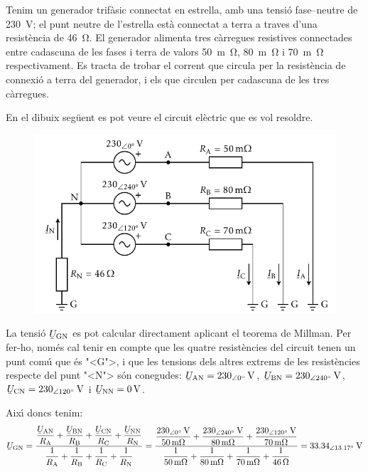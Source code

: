 \begin{exemple}

Tenim un generador trif\`{a}sic connectat en estrella, amb una tensi\'{o} fase--neutre de \SI{230}{V}; el punt neutre de l'estrella est\`{a} connectat a terra a traves d'una resist\`{e}ncia de \SI{46}{\ohm}. El generador alimenta tres c\`{a}rregues resistives connectades entre cadascuna de les fases i terra de valors \SI{50}{m\ohm}, \SI{80}{m\ohm} i \SI{70}{m\ohm} respectivament. Es tracta de trobar el corrent que circula per la resist\`{e}ncia de connexi\'{o} a terra del generador, i els que circulen per cadascuna de les tres c\`{a}rregues.

En el dibuix seg\"{u}ent es pot veure el circuit el\`{e}ctric que es vol resoldre.

\begin{figure}[htb]
    \centering
    \includegraphics{Imatges/Cap-Fonaments-Millman-Exemple2.pdf}
\end{figure}

La tensi\'{o} $\cmplx{U}\ped{GN}$ es pot calcular directament aplicant el teorema de Millman. Per fer-ho, nom\'{e}s cal tenir en compte que les quatre resist\`{e}ncies del circuit tenen un punt com\'{u} que \'{e}s {"<}G{">}, i que les tensions dels altres extrems de les resist\`{e}ncies respecte del punt {"<}N{">} s\'{o}n conegudes: $\cmplx{U}\ped{AN}=\SIpd{230}{0}{V}$, $\cmplx{U}\ped{BN}=\SIpd{230}{240}{V}$, $\cmplx{U}\ped{CN}=\SIpd{230}{120}{V}$ i  $\cmplx{U}\ped{NN}=\SI{0}{V}$.

Aix\'{\i} doncs tenim:
\[
\cmplx{U}\ped{GN} = \frac{ \dfrac{\cmplx{U}\ped{AN}}{R\ped{A}} + \dfrac{\cmplx{U}\ped{BN}}{R\ped{B}} + \dfrac{\cmplx{U}\ped{CN}}{R\ped{C}} + \dfrac{\cmplx{U}\ped{NN}}{R\ped{N}}} { \dfrac{1}{R\ped{A}} + \dfrac{1}{R\ped{B}} + \dfrac{1}{R\ped{C}} + \dfrac{1}{R\ped{N}} } =
\frac{\dfrac{\SIpd{230}{0}{V}}{\SI{50}{m\ohm}}+\dfrac{\SIpd{230}{240}{V}}{\SI{80}{m\ohm}}+
\dfrac{\SIpd{230}{120}{V}}{\SI{70}{m\ohm}}}{\dfrac{1}{\SI{50}{m\ohm}}+\dfrac{1}{\SI{80}{m\ohm}}+
\dfrac{1}{\SI{70}{m\ohm}}+\dfrac{1}{\SI{46}{\ohm}}} =
\SIpd{33,34}{13,17}{V}
\]


\end{exemple}
